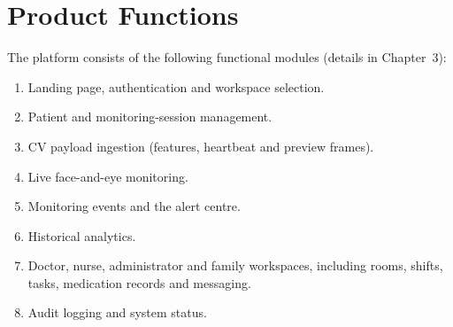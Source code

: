 \documentclass[a4paper,11pt]{scrreprt}
\begin{document}
\section{Product Functions}
The platform consists of the following functional modules (details in Chapter~3):
\begin{enumerate}[label=\arabic*.]
  \item Landing page, authentication and workspace selection.
  \item Patient and monitoring-session management.
  \item CV payload ingestion (features, heartbeat and preview frames).
  \item Live face-and-eye monitoring.
  \item Monitoring events and the alert centre.
  \item Historical analytics.
  \item Doctor, nurse, administrator and family workspaces, including rooms, shifts, tasks, medication records and messaging.
  \item Audit logging and system status.
\end{enumerate}
\end{document}
